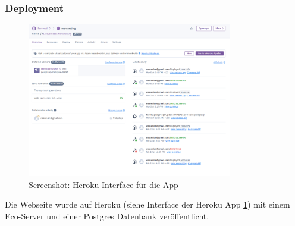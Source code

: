 \subsubsection*{Deployment}

\begin{figure}[ht]
    \centering
    \includegraphics[width=0.8\textwidth]{images/Heroku.png}
    \caption{Screenshot: Heroku Interface für die App}
    \label{fig:r-deployment}
\end{figure}

Die Webseite wurde auf Heroku (siehe Interface der Heroku App
\ref{fig:r-deployment}) mit einem Eco-Server und einer Postgres Datenbank
veröffentlicht.




